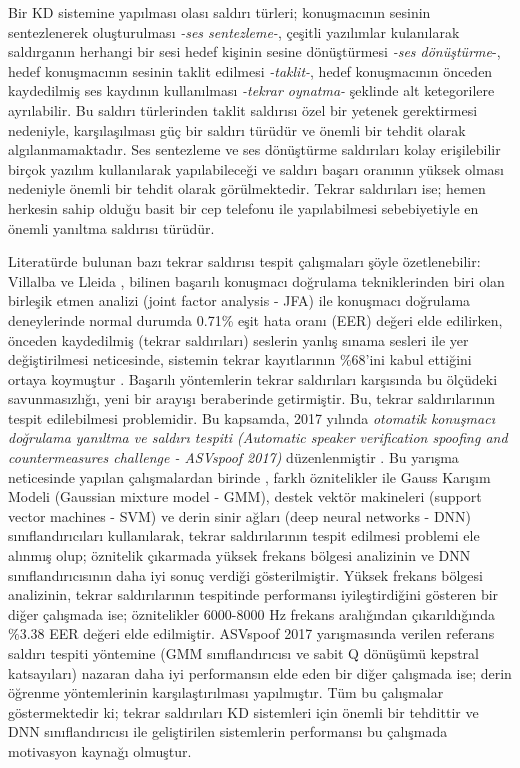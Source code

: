 \documentclass[conference, a4paper]{IEEEtran}
\begin{document}
Bir KD sistemine yapılması olası saldırı türleri; konuşmacının sesinin sentezlenerek oluşturulması
\emph{-ses sentezleme-}\cite{de2012evaluation}, çeşitli yazılımlar kulanılarak saldırganın herhangi bir sesi hedef
kişinin sesine dönüştürmesi \emph{-ses dönüştürme}-\cite{stylianou2009voice}, hedef konuşmacının sesinin taklit
edilmesi \emph{-taklit-}\cite{hautamaki2015automatic}, hedef konuşmacının önceden kaydedilmiş ses kaydının kullanılması
\emph{-tekrar oynatma-} \cite{wu2015spoofing} şeklinde alt ketegorilere ayrılabilir. Bu
saldırı türlerinden taklit saldırısı özel bir yetenek gerektirmesi nedeniyle, karşılaşılması güç bir saldırı türüdür
ve önemli bir tehdit olarak algılanmamaktadır. Ses sentezleme ve ses dönüştürme saldırıları kolay erişilebilir birçok
yazılım kullanılarak yapılabileceği ve saldırı başarı oranının yüksek olması nedeniyle önemli bir tehdit olarak
görülmektedir. Tekrar saldırıları ise; hemen herkesin sahip olduğu basit bir cep telefonu ile yapılabilmesi
sebebiyetiyle en önemli yanıltma saldırısı türüdür.

Literatürde bulunan bazı tekrar saldırısı tespit çalışmaları şöyle özetlenebilir: Villalba ve Lleida
\cite{villalba2010speaker}, bilinen başarılı konuşmacı doğrulama tekniklerinden biri olan birleşik etmen
analizi (joint factor analysis - JFA) ile konuşmacı doğrulama deneylerinde normal durumda 0.71\% eşit hata oranı (EER)
değeri elde edilirken, önceden kaydedilmiş (tekrar saldırıları) seslerin yanlış sınama sesleri ile yer değiştirilmesi
neticesinde, sistemin tekrar kayıtlarının \%68'ini kabul ettiğini ortaya koymuştur
\cite{villalba2010speaker}. Başarılı yöntemlerin tekrar saldırıları karşısında bu ölçüdeki savunmasızlığı,
yeni bir arayışı beraberinde getirmiştir. Bu, tekrar saldırılarının tespit edilebilmesi problemidir. Bu kapsamda, 2017
yılında \emph{otomatik konuşmacı doğrulama yanıltma ve saldırı tespiti (Automatic speaker verification spoofing and
    countermeasures challenge - ASVspoof 2017)} düzenlenmiştir \cite{kinnunen2017asvspoof}. Bu yarışma
neticesinde yapılan çalışmalardan birinde \cite{li2017study}, farklı öznitelikler ile Gauss Karışım Modeli
(Gaussian mixture model - GMM), destek vektör makineleri (support vector machines - SVM) ve derin sinir ağları (deep
neural networks - DNN) sınıflandırıcıları kullanılarak, tekrar saldırılarının tespit edilmesi problemi ele alınmış
olup; öznitelik çıkarmada yüksek frekans bölgesi analizinin ve DNN sınıflandırıcısının daha iyi sonuç verdiği
gösterilmiştir.
Yüksek frekans bölgesi analizinin, tekrar saldırılarının tespitinde performansı iyileştirdiğini gösteren bir diğer
çalışmada \cite{witkowski2017audio} ise; öznitelikler 6000-8000 Hz frekans aralığından çıkarıldığında \%3.38 EER değeri
elde edilmiştir. ASVspoof 2017 yarışmasında verilen referans saldırı tespiti yöntemine (GMM sınıflandırıcısı ve sabit
Q dönüşümü kepstral katsayıları) nazaran daha iyi performansın elde eden bir diğer çalışmada
\cite{nagarsheth2017replay} ise; derin öğrenme yöntemlerinin karşılaştırılması yapılmıştır. Tüm bu çalışmalar
göstermektedir ki; tekrar saldırıları KD sistemleri için önemli bir tehdittir ve DNN sınıflandırıcısı ile geliştirilen
sistemlerin performansı bu çalışmada motivasyon kaynağı olmuştur.
\end{document}
